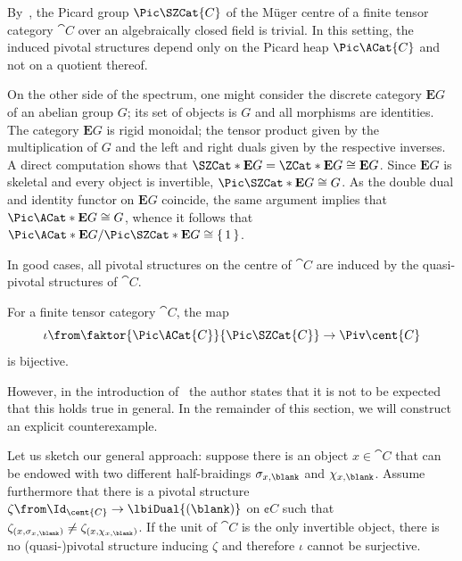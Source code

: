 \begin{example}\label{ex: projection_modular_tensor_category}
  By~\cite[Theorem~1.1]{Shimizu2019:non-degeneracy},
  the Picard group \(\Pic \SZCat{C}\)
  of the Müger centre of a finite tensor category \(\cat{C}\) over an algebraically closed field
  is trivial.
  In this setting, the induced pivotal structures depend only on the Picard heap \(\Pic \ACat{C}\)
  and not on a quotient thereof.

  On the other side of the spectrum, one might consider the discrete category \(\mathbf{E}G\) of an abelian group \(G\);
  its set of objects is \(G\) and all morphisms are identities.
  The category \(\mathbf{E}G\) is rigid monoidal;
  the tensor product given by the multiplication of \(G\)
  and the left and right duals given by the respective inverses.
  A direct computation shows that
  \(\SZCat*{\mathbf{E}G} = \ZCat*{\mathbf{E}G} \cong \mathbf{E}G\).
  Since \(\mathbf{E}G\) is skeletal
  and every object is invertible, \(\Pic \SZCat*{\mathbf{E}G} \cong G\).
  As the double dual and identity functor on \(\mathbf{E}G\) coincide,
  the same argument implies that \(\Pic\ACat*{\mathbf{E}G} \cong G\),
  whence it follows that \(\Pic\ACat*{\mathbf{E}G} / \Pic\SZCat*{\mathbf{E}G} \cong \{\,1\,\}\).
\end{example}

In good cases, all pivotal structures on the centre of \(\cat{C}\)
are induced by the quasi-pivotal structures of \(\cat{C}\).

\begin{proposition}
  For a finite tensor category \(\cat{C}\),
  the map
  \[
    \iota \from \faktor{\Pic\ACat{C}}{\Pic\SZCat{C}} \to \Piv\cent{C}
  \]
  is bijective.
\end{proposition}

However, in the introduction of~\cite{shimizu23:pivot-drinf}
the author states that it is not to be expected that this holds true in general.
In the remainder of this section, we will construct an explicit counterexample.

Let us sketch our general approach:
suppose there is an object \(x \in \cat{C}\)
that can be endowed with two different half-braidings \(\sigma_{x, \blank}\) and \(\chi_{x, \blank}\).
Assume furthermore that there is a pivotal structure \(\zeta \from \Id_{\cent{C}} \to \lbiDual{(\blank)}\) on \(\cent{C}\) such that \(\zeta_{(x,\sigma_{x,\blank})} \neq \zeta_{(x, \chi_{x, \blank})}\).
If the unit of \(\cat{C}\) is the only invertible object,
there is no (quasi-)pivotal structure inducing \(\zeta\) and therefore
\(\iota\) cannot be surjective.
\bigskip

